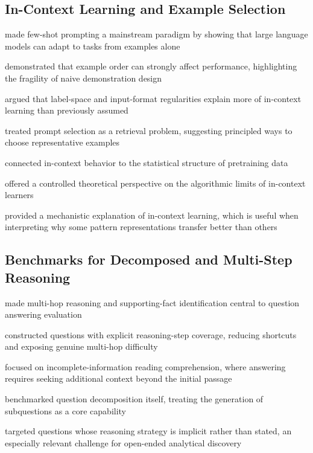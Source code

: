 \documentclass[sigconf,nonacm,anonymous]{acmart}
\begin{document}
\subsection{In-Context Learning and Example Selection}

\cite{nipsxyz} made few-shot prompting a mainstream paradigm by showing that large language models can adapt to tasks from examples alone

\cite{lu-etal-2022-fantastically} demonstrated that example order can strongly affect performance, highlighting the fragility of naive demonstration design

\cite{min-etal-2022-rethinking} argued that label-space and input-format regularities explain more of in-context learning than previously assumed

\cite{rubin-etal-2022-learning} treated prompt selection as a retrieval problem, suggesting principled ways to choose representative examples

\cite{nipsabc} connected in-context behavior to the statistical structure of pretraining data

\cite{nipsabcxyz} offered a controlled theoretical perspective on the algorithmic limits of in-context learners

\cite{xie2022an} provided a mechanistic explanation of in-context learning, which is useful when interpreting why some pattern representations transfer better than others

\subsection{Benchmarks for Decomposed and Multi-Step Reasoning}

\cite{yang-etal-2018-hotpotqa} made multi-hop reasoning and supporting-fact identification central to question answering evaluation

\cite{ho-etal-2020-constructing} constructed questions with explicit reasoning-step coverage, reducing shortcuts and exposing genuine multi-hop difficulty

\cite{ferguson-etal-2020-iirc} focused on incomplete-information reading comprehension, where answering requires seeking additional context beyond the initial passage

\cite{wolfson-etal-2020-break} benchmarked question decomposition itself, treating the generation of subquestions as a core capability

\cite{geva-etal-2021-aristotle} targeted questions whose reasoning strategy is implicit rather than stated, an especially relevant challenge for open-ended analytical discovery
\end{document}
